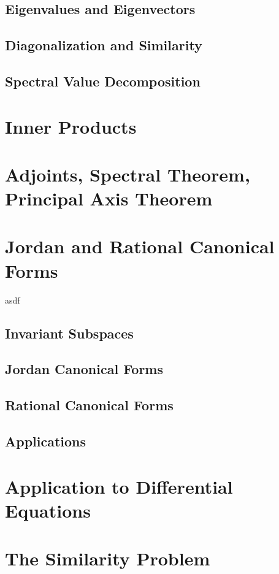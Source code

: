 \documentclass[11pt]{report}
\begin{document}
\section{Eigenvalues and Eigenvectors}
\section{Diagonalization and Similarity}
\section{Spectral Value Decomposition}


\chapter{Inner Products}


\chapter{Adjoints, Spectral Theorem, Principal Axis Theorem}


\chapter{Jordan and Rational Canonical Forms}
asdf
\section{Invariant Subspaces}
\section{Jordan Canonical Forms}
\section{Rational Canonical Forms}
\section{Applications}


\chapter{Application to Differential Equations}


\chapter{The Similarity Problem}
\end{document}
